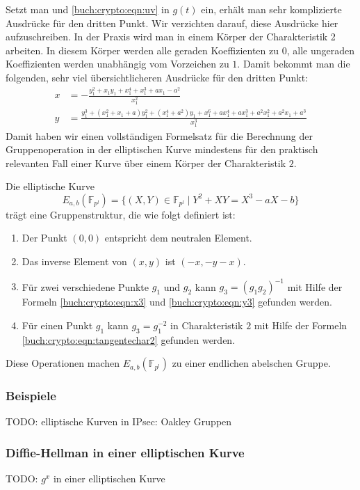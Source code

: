 Setzt man
\label{buch:crypto:eqn:t}
und
\eqref{buch:crypto:eqn:uv}
in $g(t)$ ein, erhält man sehr komplizierte Ausdrücke für den dritten Punkt.
Wir verzichten darauf, diese Ausdrücke hier aufzuschreiben.
In der Praxis wird man in einem Körper der Charakteristik 2 arbeiten.
In diesem Körper werden alle geraden Koeffizienten zu $0$, alle ungeraden
Koeffizienten werden unabhängig vom Vorzeichen zu $1$.
Damit bekommt man die folgenden, sehr viel übersichtlicheren Ausdrücke
für den dritten Punkt:
\begin{equation}
\begin{aligned}
x
&=
-\frac{
y_1^2+x_1y_1+x_1^4+x_1^3+ax_1-a^2
 }{
x_1^2
}
\\
y
&=
\frac{
y_1^3+(x_1^2+x_1+a)y_1^2+(x_1^4 +a^2)y_1+x_1^6+ax_1^4+ax_1^3+a^2x_1^2+a^2x_1+a^3
}{
 x_1^3
}
\end{aligned}
\label{buch:crypto:eqn:tangentechar2}
\end{equation}
Damit haben wir einen vollständigen Formelsatz für die Berechnung der
Gruppenoperation in der elliptischen Kurve mindestens für den praktisch
relevanten Fall einer Kurve über einem Körper der Charakteristik $2$.

\begin{satz}
Die elliptische Kurve
\[
E_{a,b}(\mathbb{F}_{p^l})
=
\{
(X,Y)\in\mathbb{F}_{p^l}
\;|\;
Y^2+XY = X^3-aX-b
\}
\]
trägt eine Gruppenstruktur, die wie folgt definiert ist:
\begin{enumerate}
\item Der Punkt $(0,0)$ entspricht dem neutralen Element.
\item Das inverse Element von $(x,y)$ ist $(-x,-y-x)$.
\item Für zwei verschiedene Punkte $g_1$ und $g_2$ kann $g_3=(g_1g_2)^{-1}$
mit Hilfe der Formeln
\eqref{buch:crypto:eqn:x3}
und
\eqref{buch:crypto:eqn:y3}
gefunden werden.
\item Für einen Punkt $g_1$ kann $g_3=g_1^{-2}$ in Charakteristik $2$ mit
Hilfe der Formeln
\eqref{buch:crypto:eqn:tangentechar2}
gefunden werden.
\end{enumerate}
Diese Operationen machen $E_{a,b}(\mathbb{F}_{p^l})$ zu einer endlichen
abelschen Gruppe.
\end{satz}

\subsubsection{Beispiele}
TODO: elliptische Kurven in IPsec: Oakley Gruppen

\subsubsection{Diffie-Hellman in einer elliptischen Kurve}
TODO: $g^x$ in einer elliptischen Kurve



